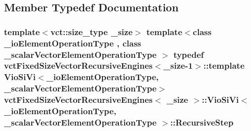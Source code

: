\subsection{Member Typedef Documentation}
\hypertarget{classvct_fixed_size_vector_recursive_engines_1_1_vio_si_vi_adb732c70954b6a4f3ddd7b55b273dcc3}{
\subsubsection[{Recursive\-Step}]{\setlength{\rightskip}{0pt plus 5cm}template$<$vct\-::size\-\_\-type \-\_\-size$>$ template$<$class \-\_\-io\-Element\-Operation\-Type , class \-\_\-scalar\-Vector\-Element\-Operation\-Type $>$ typedef {\bf vct\-Fixed\-Size\-Vector\-Recursive\-Engines}$<$\-\_\-size-\/1$>$\-::template {\bf Vio\-Si\-Vi}$<$\-\_\-io\-Element\-Operation\-Type, \-\_\-scalar\-Vector\-Element\-Operation\-Type$>$ {\bf vct\-Fixed\-Size\-Vector\-Recursive\-Engines}$<$ \-\_\-size $>$\-::{\bf Vio\-Si\-Vi}$<$ \-\_\-io\-Element\-Operation\-Type, \-\_\-scalar\-Vector\-Element\-Operation\-Type $>$\-::{\bf Recursive\-Step}}}\label{classvct_fixed_size_vector_recursive_engines_1_1_vio_si_vi_adb732c70954b6a4f3ddd7b55b273dcc3}


